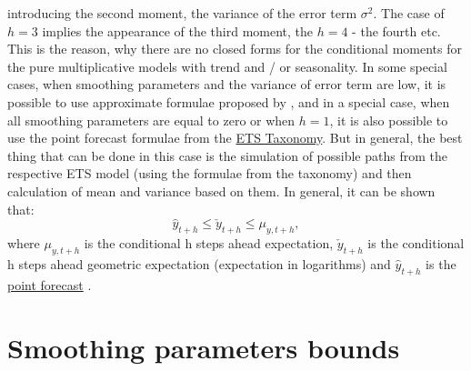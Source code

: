 \documentclass[
]{book}
\theoremstyle{definition}
\theoremstyle{definition}
\theoremstyle{definition}
\theoremstyle{definition}
\theoremstyle{remark}
\begin{document}
introducing the second moment, the variance of the error term \(\sigma^2\). The case of \(h=3\) implies the appearance of the third moment, the \(h=4\) - the fourth etc. This is the reason, why there are no closed forms for the conditional moments for the pure multiplicative models with trend and / or seasonality. In some special cases, when smoothing parameters and the variance of error term are low, it is possible to use approximate formulae proposed by \citet{Hyndman2008b}, and in a special case, when all smoothing parameters are equal to zero or when \(h=1\), it is also possible to use the point forecast formulae from the \protect\hyperlink{ETSTaxonomyMaths}{ETS Taxonomy}. But in general, the best thing that can be done in this case is the simulation of possible paths from the respective ETS model (using the formulae from the taxonomy) and then calculation of mean and variance based on them. In general, it can be shown that:
\begin{equation}
    \hat{y}_{t+h} \leq \check{y}_{t+h} \leq \mu_{y,t+h} ,
    \label{eq:ETSADAMpointValueInequality}
\end{equation}
where \(\mu_{y,t+h}\) is the conditional h steps ahead expectation, \(\check{y}_{t+h}\) is the conditional h steps ahead geometric expectation (expectation in logarithms) and \(\hat{y}_{t+h}\) is the \protect\hyperlink{ETSTaxonomyMaths}{point forecast} \citep{Svetunkov2020ETS}.

\hypertarget{stabilityConditionMultiplicativeError}{%
\section{Smoothing parameters bounds}\label{stabilityConditionMultiplicativeError}}
\end{document}
